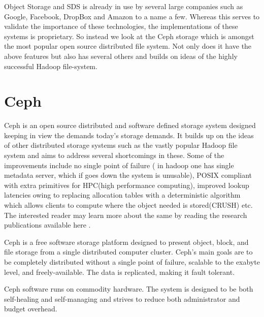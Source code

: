 \documentclass[a4paper,10pt]{article}
\begin{document}
Object Storage and SDS is already in use by several large companies such as Google, Facebook, DropBox and Amazon to a name a few. Whereas this serves to validate the importance of these technologies, the implementations of these systems is proprietary. So instead we look at the Ceph storage which is amongst the most popular open source distributed file system. Not only does it have the above features but also has several others and builds on ideas of the highly successful Hadoop file-system.

\section{Ceph}

    Ceph \cite{cephwiki} is an open source distributed and software defined storage system designed keeping in view the demands today's storage demands. It builds up on the ideas of other distributed storage systems such as the vastly popular Hadoop file system and aims to address several shortcomings in these. Some of the improvements include no single point of failure ( in hadoop one has single metadata server, which if goes down the system is unusable), POSIX compliant with extra primitives for HPC(high performance computing), improved lookup latencies owing to replacing allocation tables with a deterministic algorithm which allows clients to compute where the object needed is stored(CRUSH) etc. The interested reader may learn more about the same by reading the research publications available here \cite{cephpub}.

Ceph is a free software storage platform designed to present object, block, and file storage from a single distributed computer cluster. Ceph's main goals are to be completely distributed without a single point of failure, scalable to the exabyte level, and freely-available. The data is replicated, making it fault tolerant.\cite{andrew}

Ceph software runs on commodity hardware. The system is designed to be both self-healing and self-managing and strives to reduce both administrator and budget overhead.
\end{document}
